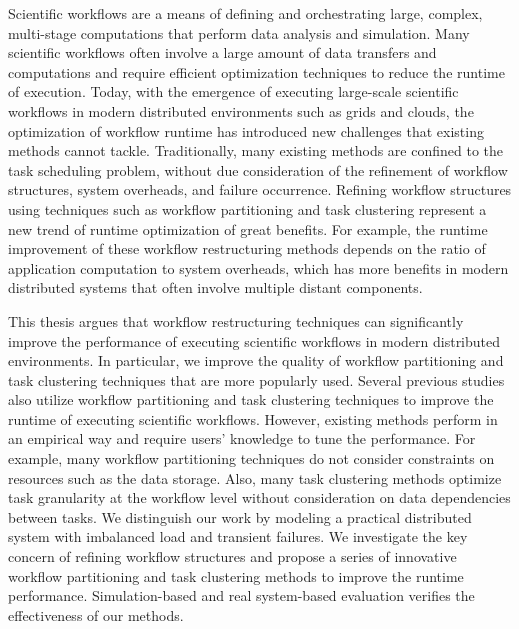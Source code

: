 Scientific workflows are a means of defining and orchestrating large, complex, multi-stage computations that perform data analysis and simulation. 
Many scientific workflows often involve a large amount of data transfers and computations and require efficient optimization techniques to reduce the runtime of execution. 
Today, with the emergence of executing large-scale scientific workflows in modern distributed environments such as grids and clouds, the optimization of workflow runtime has introduced new challenges that existing methods cannot tackle. Traditionally, many existing methods are confined to the task scheduling problem, without due consideration of the refinement of workflow structures, system overheads, and failure occurrence. Refining workflow structures using techniques such as workflow partitioning and task clustering represent a new trend of runtime optimization of great benefits. 
For example, the runtime improvement of these workflow restructuring methods depends on the ratio of application computation to system overheads, which has more benefits in modern distributed systems that often involve multiple distant components. 

This thesis argues that workflow restructuring techniques can significantly improve the performance of executing scientific workflows in modern distributed environments. In particular, we improve the quality of workflow partitioning and task clustering techniques that are more popularly used. Several previous studies also utilize workflow partitioning and task clustering techniques to improve the runtime of executing scientific workflows. However, existing methods perform in an empirical way and require users' knowledge to tune the performance. For example, many workflow partitioning techniques do not consider constraints on resources such as the data storage. Also, many task clustering methods optimize task granularity at the workflow level without consideration on data dependencies between tasks. We distinguish our work by modeling a practical distributed system with imbalanced load and transient failures. 
We investigate the key concern of refining workflow structures and propose a series of innovative workflow partitioning and task clustering methods to improve the runtime performance. Simulation-based and real system-based evaluation verifies the effectiveness of our methods. 


